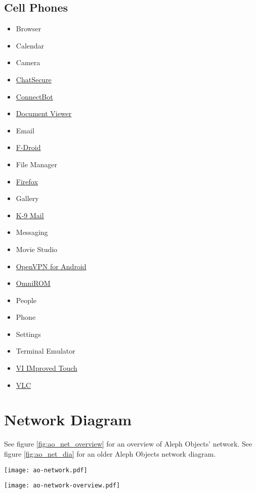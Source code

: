 \subsection{Cell Phones}
\begin{itemize}
\item Browser
\item Calendar
\item Camera
\item \href{https://chatsecure.org/}{ChatSecure}
\item \href{http://code.google.com/p/connectbot/}{ConnectBot}
\item \href{https://github.com/dschuermann/document-viewer}{Document Viewer}
\item Email
\item \href{https://f-droid.org/}{F-Droid}
\item File Manager
\item \href{http://www.mozilla.org/en-US/firefox/}{Firefox}
\item Gallery
\item \href{http://code.google.com/p/k9mail/}{K-9 Mail}
\item Messaging
\item Movie Studio
\item \href{https://code.google.com/p/ics-openvpn/}{OpenVPN for Android}
\item \href{https://omnirom.org/}{OmniROM}
\item People
\item Phone
\item Settings
\item Terminal Emulator
\item \href{https://github.com/momodalo/vimtouch}{VI IMproved Touch}
\item \href{http://www.videolan.org/vlc/download-android.html}{VLC}
\end{itemize}

\section{Network Diagram}
See figure \ref{fig:ao_net_overview} for an overview of Aleph Objects' network.
See figure \ref{fig:ao_net_dia} for an older Aleph Objects network diagram.

\begin{sidewaysfigure}[p]
\texttt{[image: ao-network.pdf]}
 \caption{Network Diagram}
 \label{fig:ao_net_dia}
\end{sidewaysfigure}

\begin{sidewaysfigure}[p]
\texttt{[image: ao-network-overview.pdf]}
 \caption{Aleph Objects Network Overview}
 \label{fig:ao_net_overview}
\end{sidewaysfigure}


